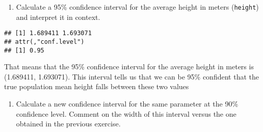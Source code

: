 \documentclass[
]{article}
\newenvironment{Shaded}{\begin{snugshade}}{\end{snugshade}}
\newcommand{\AttributeTok}[1]{\textcolor[rgb]{0.77,0.63,0.00}{#1}}
\newcommand{\CommentTok}[1]{\textcolor[rgb]{0.56,0.35,0.01}{\textit{#1}}}
\newcommand{\FloatTok}[1]{\textcolor[rgb]{0.00,0.00,0.81}{#1}}
\newcommand{\FunctionTok}[1]{\textcolor[rgb]{0.00,0.00,0.00}{#1}}
\newcommand{\NormalTok}[1]{#1}
\newcommand{\OtherTok}[1]{\textcolor[rgb]{0.56,0.35,0.01}{#1}}
\newcommand{\SpecialCharTok}[1]{\textcolor[rgb]{0.00,0.00,0.00}{#1}}
\providecommand{\tightlist}{%
  \setlength{\itemsep}{0pt}\setlength{\parskip}{0pt}}
\begin{document}
\begin{enumerate}
\def\labelenumi{\arabic{enumi}.}
\setcounter{enumi}{7}
\tightlist
\item
  Calculate a 95\% confidence interval for the average height in meters
  (\texttt{height}) and interpret it in context.
\end{enumerate}

\begin{Shaded}
\end{Shaded}

\begin{verbatim}
## [1] 1.689411 1.693071
## attr(,"conf.level")
## [1] 0.95
\end{verbatim}

That means that the 95\% confidence interval for the average height in
meters is (1.689411, 1.693071). This interval tells us that we can be
95\% confident that the true population mean height falls between these
two values

\begin{enumerate}
\def\labelenumi{\arabic{enumi}.}
\setcounter{enumi}{8}
\tightlist
\item
  Calculate a new confidence interval for the same parameter at the 90\%
  confidence level. Comment on the width of this interval versus the one
  obtained in the previous exercise.
\end{enumerate}

\begin{Shaded}
\end{Shaded}
\end{document}

